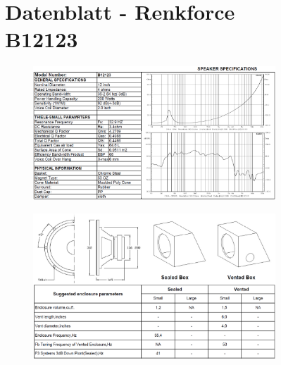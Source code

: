 \begin{figure}
	\section{Datenblatt - Renkforce B12123}\label{sec:8.7}
	\begin{figure} [H]
		\centering
		\includegraphics[width=1\textwidth]{img/LSMessung/TT/Renkforce-Datasheet1.png}
	\end{figure}
\end{figure}
	\begin{figure}
	\begin{figure} [H]
		\centering
		\includegraphics[width=1\textwidth]{img/LSMessung/TT/Renkforce-Datasheet2.png}
	\end{figure}
\end{figure}


\newpage
